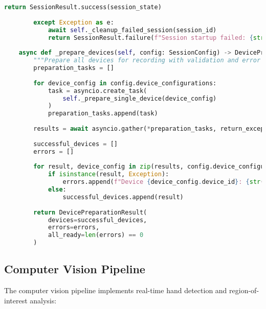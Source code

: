 \documentclass[11pt,a4paper]{report}
\begin{document}
\begin{lstlisting}[language=Python]
            return SessionResult.success(session_state)
            
        except Exception as e:
            await self._cleanup_failed_session(session_id)
            return SessionResult.failure(f"Session startup failed: {str(e)}")
    
    async def _prepare_devices(self, config: SessionConfig) -> DevicePreparationResult:
        """Prepare all devices for recording with validation and error recovery."""
        preparation_tasks = []
        
        for device_config in config.device_configurations:
            task = asyncio.create_task(
                self._prepare_single_device(device_config)
            )
            preparation_tasks.append(task)
        
        results = await asyncio.gather(*preparation_tasks, return_exceptions=True)
        
        successful_devices = []
        errors = []
        
        for result, device_config in zip(results, config.device_configurations):
            if isinstance(result, Exception):
                errors.append(f"Device {device_config.device_id}: {str(result)}")
            else:
                successful_devices.append(result)
        
        return DevicePreparationResult(
            devices=successful_devices,
            errors=errors,
            all_ready=len(errors) == 0
        )
\end{lstlisting}

\subsection{Computer Vision Pipeline}

The computer vision pipeline implements real-time hand detection and region-of-interest analysis:
\end{document}
